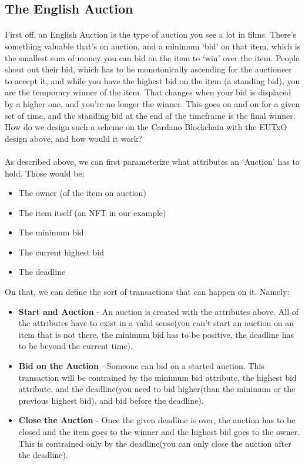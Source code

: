 \documentclass[a4paper, 11pt]{article}
\begin{document}
    \subsection{The English Auction}
    
    \paragraph{} First off, an English Auction is the type of auction you see a lot in films. There's something valuable that's on auction, and a minimum `bid' on that item, which is the smallest sum of money you can bid on the item to `win' over the item. People shout out their bid, which has to be monotonically ascending for the auctioneer to accept it, and while you have the highest bid on the item (a standing bid), you are the temporary winner of the item. That changes when your bid is displaced by a higher one, and you're no longer the winner. This goes on and on for a given set of time, and the standing bid at the end of the timeframe is the final winner. How do we design such a scheme on the Cardano Blockchain with the EUTxO design above, and how would it work?

    \paragraph{} As described above, we can first parameterize what attributes an `Auction' has to hold. Those would be:

    \begin{itemize}
        \item The owner (of the item on auction)
        \item The item itself (an NFT in our example)
        \item The minimum bid
        \item The current highest bid
        \item The deadline
    \end{itemize}

    On that, we can define the sort of transactions that can happen on it. Namely:
    \begin{itemize}
        \item \textbf{Start and Auction} - An auction is created with the attributes above. All of the attributes have to exist in a valid sense(you can't start an auction on an item that is not there, the minimum bid has to be positive, the deadline has to be beyond the current time).
        \item \textbf{Bid on the Auction} - Someone can bid on a started auction. This transaction will be contrained by the minimum bid attribute, the highest bid attribute, and the deadline(you need to bid higher(than the minimum or the previous highest bid), and bid before the deadline).
        \item \textbf{Close the Auction} - Once the given deadline is over, the auction has to be closed and the item goes to the winner and the highest bid goes to the owner. This is contrained only by the deadline(you can only close the auction after the deadline).
    \end{itemize} 
\end{document}
